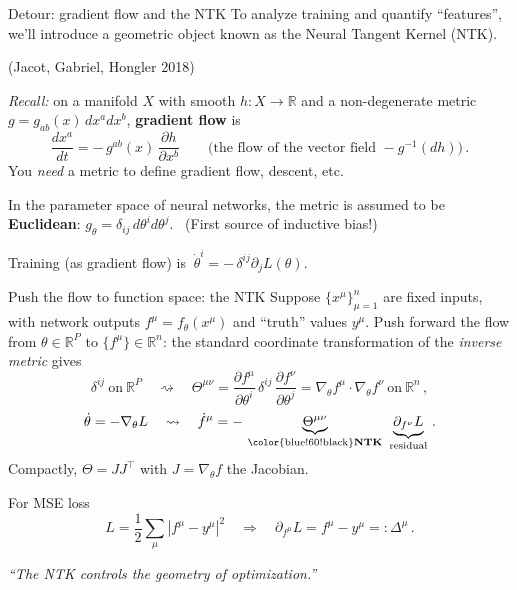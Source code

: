 \documentclass[11pt]{beamer}
\newcommand{\R}{\mathbb{R}}
\newcommand{\pd}{\partial}
\newcommand{\hl}[1]{{\color{blue!60!black}\textbf{#1}}}
\begin{document}
\begin{frame}{Detour: gradient flow and the NTK}
  To analyze training and quantify ``features'', we'll introduce a geometric object known as the Neural Tangent Kernel (NTK).
  
  (Jacot, Gabriel, Hongler 2018)

\bigskip

  \emph{Recall:} on a manifold $X$ with smooth $h: X\to\R$ and a
  non-degenerate metric $g = g_{ab}(x)\,dx^a dx^b$, \hl{gradient flow}
  is
  \[
    \frac{dx^a}{dt} = -\,g^{ab}(x)\,\frac{\pd h}{\pd x^b}
    \qquad\text{(the flow of the vector field } -g^{-1}(dh)\text{)}\,.
  \]
  You \emph{need} a metric to define gradient flow, descent, etc.
  \vspace{2mm}

  In the parameter space of neural networks, the metric is assumed to be
  \hl{Euclidean}: $g_\theta = \delta_{ij}\, d\theta^i d\theta^j$.
  \ (First source of inductive bias!)
  \vspace{1mm}

  Training (as gradient flow) is $\ \dot\theta^i = -\,\delta^{ij}\pd_j L(\theta)$.
\end{frame}

\begin{frame}{Push the flow to function space: the NTK}
  Suppose $\{x^\mu\}_{\mu=1}^n$ are fixed inputs, with network outputs
  $f^\mu = f_\theta(x^\mu)$ and ``truth'' values $y^\mu$. Push forward
  the flow from $\theta\in\R^P$ to $\{f^\mu\}\in\R^n$: the standard
  coordinate transformation of the \emph{inverse metric} gives
  \[
    \delta^{ij}\ \text{on}\ \R^P
    \quad\rightsquigarrow\quad
    \Theta^{\mu\nu} = \frac{\pd f^\mu}{\pd\theta^i}\,\delta^{ij}\,
    \frac{\pd f^\nu}{\pd\theta^j}
    = \nabla_\theta f^\mu \cdot \nabla_\theta f^\nu\ \text{on}\ \R^n\,,
  \]
  \[
    \dot\theta = -\nabla_\theta L
    \quad\rightsquigarrow\quad
    \dot f^\mu = - \,\underbrace{\Theta^{\mu\nu}}_{\text{\hl{NTK}}}\ \underbrace{\pd_{f^\nu} L}_{\text{residual}}\,.
  \]
  Compactly, $\Theta = J J^{\!\top}$ with $J = \nabla_\theta f$ the
  Jacobian.
  
   For MSE loss
   \[ L = \frac12\sum_\mu |f^\mu - y^\mu|^2\quad\Rightarrow\quad
  \pd_{f^\mu}L = f^\mu - y^\mu =: \Delta^\mu \,. \] 

  \emph{``The NTK controls the geometry of optimization.''}
\end{frame}
\end{document}
